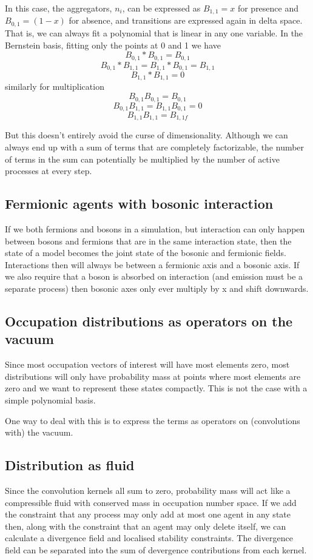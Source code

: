 \documentclass[a4paper]{article}
\begin{document}
In this case, the aggregators, $n_i$, can be expressed as $B_{1,1}=x$ for presence and $B_{0,1}=(1-x)$ for absence, and transitions are expressed again in delta space. That is, we can always fit a polynomial that is linear in any one variable. In the Bernstein basis, fitting only the points at 0 and 1 we have 
\[
B_{0,1} \ast B_{0,1} = B_{0,1}
\]
\[B_{0,1} \ast B_{1,1} = B_{1,1} \ast B_{0,1} = B_{1,1}\]
\[
B_{1,1} \ast B_{1,1} = 0
\]
similarly for multiplication
\[
B_{0,1}B_{0,1} = B_{0,1}
\]
\[
B_{0,1}B_{1,1} = B_{1,1}B_{0,1} = 0
\]
\[
B_{1,1}B_{1,1} = B_{1,1f}
\]

But this doesn't entirely avoid the curse of dimensionality. Although we can always end up with a sum of terms that are completely factorizable, the number of terms in the sum can potentially be multiplied by the number of active processes at every step.

\subsection{Fermionic agents with bosonic interaction}

If we both fermions and bosons in a simulation, but interaction can only happen between bosons and fermions that are in the same interaction state, then the state of a model becomes the joint state of the bosonic and fermionic fields. Interactions then will always be between a fermionic axis and a bosonic axis. If we also require that a boson is absorbed on interaction (and emission must be a separate process) then bosonic axes only ever multiply by x and shift downwards.

\subsection{Occupation distributions as operators on the vacuum}
Since most occupation vectors of interest will have most elements zero, most distributions will only have probability mass at points where most elements are zero and we want to represent these states compactly. This is not the case with a simple polynomial basis.

One way to deal with this is to express the terms as operators on (convolutions with) the vacuum.

\subsection{Distribution as fluid}
Since the convolution kernels all sum to zero, probability mass will act like a compressible fluid with conserved mass in occupation number space. If we add the constraint that any process may only add at most one agent in any state then, along with the constraint that an agent may only delete itself, we can calculate a divergence field and localised stability constraints. The divergence field can be separated into the sum of devergence contributions from each kernel.
\end{document}
